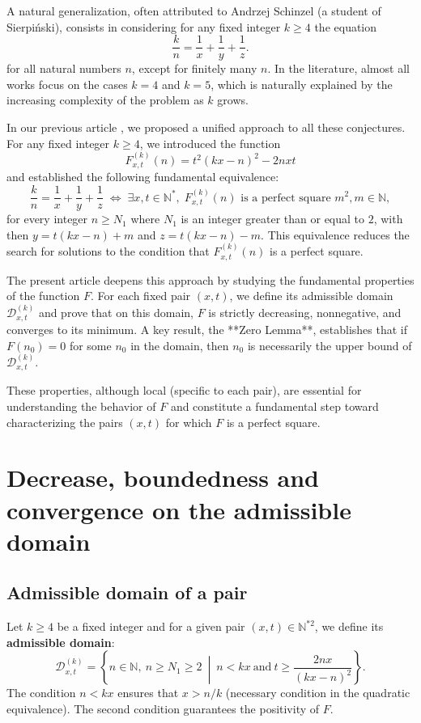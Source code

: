 \documentclass[12pt]{article}
\begin{document}
A natural generalization, often attributed to Andrzej Schinzel (a student of Sierpiński), consists in considering for any fixed integer \(k\ge 4\) the equation
\[
\frac{k}{n} = \frac{1}{x} + \frac{1}{y} + \frac{1}{z}. \tag{3}
\] for all natural numbers \(n\), except for finitely many \(n\).
In the literature, almost all works focus on the cases \(k=4\) and \(k=5\), which is naturally explained by the increasing complexity of the problem as \(k\) grows.

In our previous article \cite{1}, we proposed a unified approach to all these conjectures. For any fixed integer \(k\ge 4\), we introduced the function
\[
F_{x,t}^{(k)}(n) = t^2(kx-n)^2 - 2nxt
\]
and established the following fundamental equivalence:
\[
\frac{k}{n} = \frac{1}{x} + \frac{1}{y} + \frac{1}{z} \;\Longleftrightarrow\; \exists x, t\in\mathbb{N}^*,\; F_{x,t}^{(k)}(n) \text{ is a perfect square } m^2, m\in\mathbb{N},
\] for every integer \(n\ge N_1\) where \(N_1\) is an integer greater than or equal to \(2\),
with then \(y = t(kx-n) + m\) and \(z = t(kx-n) - m\). This equivalence reduces the search for solutions to the condition that \(F_{x,t}^{(k)}(n)\) is a perfect square.

The present article deepens this approach by studying the fundamental properties of the function \(F\). For each fixed pair \((x,t)\), we define its admissible domain \(\mathcal{D}_{x,t}^{(k)}\) and prove that on this domain, \(F\) is strictly decreasing, nonnegative, and converges to its minimum. A key result, the **Zero Lemma**, establishes that if \(F(n_0)=0\) for some \(n_0\) in the domain, then \(n_0\) is necessarily the upper bound of \(\mathcal{D}_{x,t}^{(k)}\).

These properties, although local (specific to each pair), are essential for understanding the behavior of \(F\) and constitute a fundamental step toward characterizing the pairs \((x,t)\) for which \(F\) is a perfect square.


 \section*{Decrease, boundedness and convergence on the admissible domain}

\subsection*{Admissible domain of a pair}

Let \(k \ge 4\) be a fixed integer and for a given pair \((x,t) \in \mathbb{N}^{*2}\), we define its \textbf{admissible domain}:
\[
\mathcal{D}_{x,t}^{(k)} = \left\{ n \in \mathbb{N},\ n \ge N_1\ge 2 \ \middle|\ n < kx \ \text{and}\ t \ge \frac{2nx}{(kx-n)^2} \right\}.
\]
The condition \(n < kx\) ensures that \(x > n/k\) (necessary condition in the quadratic equivalence). The second condition guarantees the positivity of \(F\).
\end{document}
